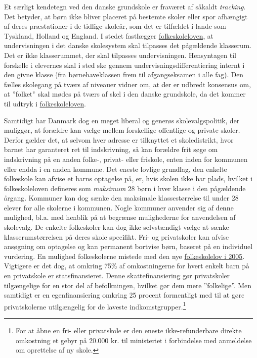 \documentclass[
]{book}
\begin{document}
Et særligt kendetegn ved den danske grundskole er fraværet af såkaldt \emph{tracking}. Det betyder, at børn ikke bliver placeret på bestemte skoler eller spor afhængigt af deres præstationer i de tidlige skoleår, som det er tilfældet i lande som Tyskland, Holland og England. I stedet fastlægger \href{https://arkiv.emu.dk/sites/default/files/2019-01/Vidensnotat\%20-\%20Undervisningsdifferentiering.pdf}{folkeskoleloven}, at undervisningen i det danske skolesystem skal tilpasses det pågældende klasserum. Det er ikke klasserummet, der skal tilpasses undervisningen. Hensyntagen til forskelle i elevernes skal i sted ske gennem undervisningsdifferentiering internt i den givne klasse (fra børnehaveklassen frem til afgangseksamen i alle fag). Den fælles skolegang på tværs af niveauer vidner om, at der er udbredt konsensus om, at ''folket'' skal mødes på tværs af skel i den danske grundskole, da det kommer til udtryk i \href{https://arkiv.emu.dk/sites/default/files/2019-01/Vidensnotat\%20-\%20Undervisningsdifferentiering.pdf}{folkeskoleloven}.

Samtidigt har Danmark dog en meget liberal og generøs skolevalgspolitik, der muliggør, at forældre kan vælge mellem forskellige offentlige og private skoler. Derfor gælder det, at selvom hver adresse er tilknyttet et skoledistrikt, hvor barnet har garanteret ret til indskrivning, så kan forældre frit søge om indskrivning på en anden folke-, privat- eller friskole, enten inden for kommunen eller endda i en anden kommune. Det eneste lovlige grundlag, den enkelte folkeskole kan afvise et barns optagelse på, er, hvis skolen ikke har plads, hvilket i folkeskoleloven defineres som \emph{maksimum} 28 børn i hver klasse i den pågældende årgang. Kommuner kan dog sænke den maksimale klassestørrelse til under 28 elever for alle skolerne i kommunen. Nogle kommuner anvender sig af denne mulighed, bl.a. med henblik på at begrænse mulighederne for anvendelsen af skolevalg. De enkelte folkeskoler kan dog ikke selvstændigt vælge at sænke klasserumstørrelsen på deres skole specifikt. Fri- og privatskoler kan afvise ansøgning om optagelse og kan permanent bortvise børn, baseret på en individuel vurdering. En mulighed folkeskolerne mistede med den nye \hyperref[ux5cux2520https:ux2fux2fwww.retsinformation.dkux2feliux2fltaux2f2005ux2f393]{folkeskolelov i 2005}. Vigtigere er det dog, at omkring 75\% af omkostningerne for hvert enkelt barn på en privatskole er statsfinansieret. Denne skattefinansiering gør privatskoler tilgængelige for en stor del af befolkningen, hvilket gør dem mere ''folkelige''. Men samtidigt er en egenfinansiering omkring 25 procent formentligt med til at gøre privatskolerne utilgængelig for de laveste indkomstgrupper.\footnote{For at åbne en fri- eller privatskole er den eneste ikke-refunderbare direkte omkostning et gebyr på 20.000 kr. til ministeriet i forbindelse med anmeldelse om oprettelse af ny skole.}
\end{document}

